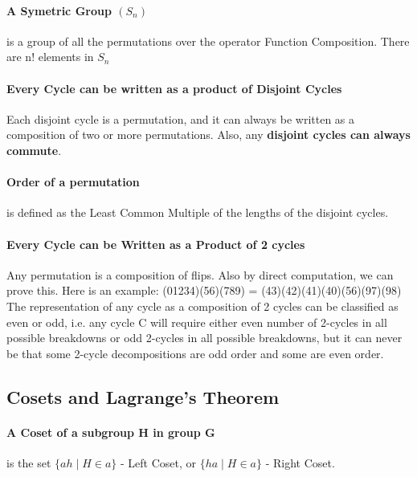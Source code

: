 \paragraph{A Symetric Group $(S_n)$} is a group of all the permutations over the operator Function Composition. There are n! elements in $S_n$
\paragraph{Every Cycle can be written as a product of Disjoint Cycles} Each disjoint cycle is a permutation, and it can always be written as a composition of two or more permutations. Also, any \textbf{disjoint cycles can always commute}.
\vspace{20px}

\paragraph{Order of a permutation} is defined as the Least Common Multiple of the lengths of the disjoint cycles.
\paragraph{Every Cycle can be Written as a Product of 2 cycles} Any permutation is a composition of flips. Also by direct computation, we can prove this. Here is an example: (01234)(56)(789) = (43)(42)(41)(40)(56)(97)(98)
\\ The representation of any cycle as a composition of 2 cycles can be classified as even or odd, i.e. any cycle C will require either even number of 2-cycles in all possible breakdowns or odd 2-cycles in all possible breakdowns, but it can never be that some 2-cycle decompositions are odd order and some are even order.


\subsection{Cosets and Lagrange's Theorem}

\paragraph{A Coset of a subgroup H in group G} is the set $\{ah\;|\;H \in a\}$ - Left Coset, or $\{ha\;|\;H \in a\}$ - Right Coset.

